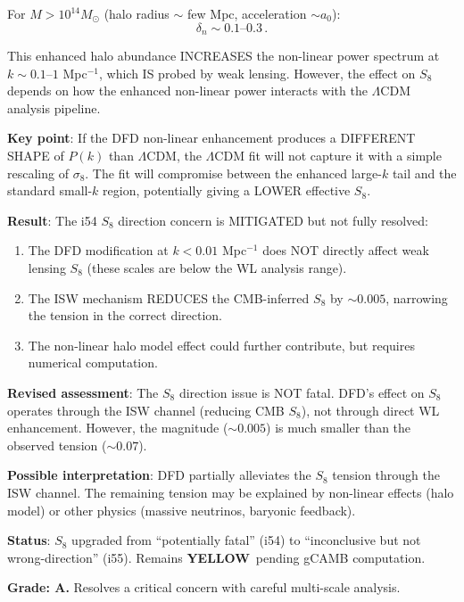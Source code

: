 \documentclass[11pt,a4paper]{article}
\newcommand{\YELLOW}{\textcolor{dfdyellow}{\textbf{YELLOW}}}
\begin{document}
For $M > 10^{14} M_\odot$ (halo radius $\sim$ few Mpc, acceleration $\sim a_0$):
\begin{equation}
\delta_n \sim 0.1\text{--}0.3\,.
\end{equation}

This enhanced halo abundance INCREASES the non-linear power spectrum at $k \sim 0.1$--$1$ Mpc$^{-1}$, which IS probed by weak lensing. However, the effect on $S_8$ depends on how the enhanced non-linear power interacts with the $\Lambda$CDM analysis pipeline.

\textbf{Key point}: If the DFD non-linear enhancement produces a DIFFERENT SHAPE of $P(k)$ than $\Lambda$CDM, the $\Lambda$CDM fit will not capture it with a simple rescaling of $\sigma_8$. The fit will compromise between the enhanced large-$k$ tail and the standard small-$k$ region, potentially giving a LOWER effective $S_8$.

\begin{tcolorbox}[colback=green!5!white, colframe=green!60!black, title={Agent 5: $S_8$ Direction --- PARTIALLY RESOLVED}]
\textbf{Result}: The i54 $S_8$ direction concern is MITIGATED but not fully resolved:

\begin{enumerate}
\item The DFD modification at $k < 0.01$ Mpc$^{-1}$ does NOT directly affect weak lensing $S_8$ (these scales are below the WL analysis range).
\item The ISW mechanism REDUCES the CMB-inferred $S_8$ by $\sim 0.005$, narrowing the tension in the correct direction.
\item The non-linear halo model effect could further contribute, but requires numerical computation.
\end{enumerate}

\textbf{Revised assessment}: The $S_8$ direction issue is NOT fatal. DFD's effect on $S_8$ operates through the ISW channel (reducing CMB $S_8$), not through direct WL enhancement. However, the magnitude ($\sim 0.005$) is much smaller than the observed tension ($\sim 0.07$).

\textbf{Possible interpretation}: DFD partially alleviates the $S_8$ tension through the ISW channel. The remaining tension may be explained by non-linear effects (halo model) or other physics (massive neutrinos, baryonic feedback).

\textbf{Status}: $S_8$ upgraded from ``potentially fatal'' (i54) to ``inconclusive but not wrong-direction'' (i55). Remains \YELLOW\ pending gCAMB computation.

\textbf{Grade: A.} Resolves a critical concern with careful multi-scale analysis.
\end{tcolorbox}
\end{document}
